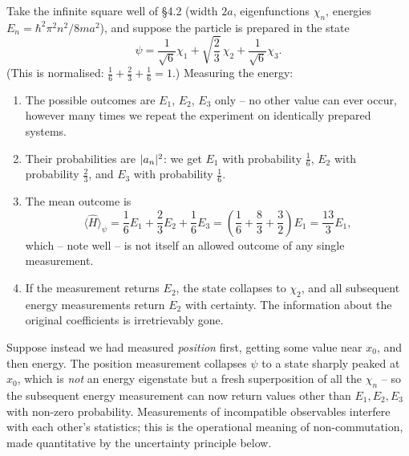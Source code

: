 \documentclass[a4paper]{scrartcl}
\begin{document}
\begin{example}
    Take the infinite square well of \S 4.2 (width $2a$, eigenfunctions $\chi_n$, energies $E_n = \hbar^2\pi^2 n^2/8ma^2$), and suppose the particle is prepared in the state
    $$
    \psi = \frac{1}{\sqrt{6}} \chi_1 + \sqrt{\frac{2}{3}} \, \chi_2 + \frac{1}{\sqrt{6}} \chi_3.
    $$
    (This is normalised: $\frac16 + \frac23 + \frac16 = 1$.) Measuring the energy:
    \begin{enumerate}[label=(\roman*)]
        \item The possible outcomes are $E_1$, $E_2$, $E_3$ only -- no other value can ever occur, however many times we repeat the experiment on identically prepared systems.
        \item Their probabilities are $\lvert a_n\rvert^2$: we get $E_1$ with probability $\frac{1}{6}$, $E_2$ with probability $\frac{2}{3}$, and $E_3$ with probability $\frac{1}{6}$.
        \item The mean outcome is
        $$
        \langle \hat{H} \rangle_\psi = \frac{1}{6}E_1 + \frac{2}{3}E_2 + \frac{1}{6}E_3 = \left( \frac{1}{6} + \frac{8}{3} + \frac{3}{2} \right) E_1 = \frac{13}{3} E_1,
        $$
        which -- note well -- is not itself an allowed outcome of any single measurement.
        \item If the measurement returns $E_2$, the state collapses to $\chi_2$, and all subsequent energy measurements return $E_2$ with certainty. The information about the original coefficients is irretrievably gone.
    \end{enumerate}
    Suppose instead we had measured \emph{position} first, getting some value near $x_0$, and then energy. The position measurement collapses $\psi$ to a state sharply peaked at $x_0$, which is \emph{not} an energy eigenstate but a fresh superposition of all the $\chi_n$ -- so the subsequent energy measurement can now return values other than $E_1, E_2, E_3$ with non-zero probability. Measurements of incompatible observables interfere with each other's statistics; this is the operational meaning of non-commutation, made quantitative by the uncertainty principle below.
\end{example}
\end{document}
